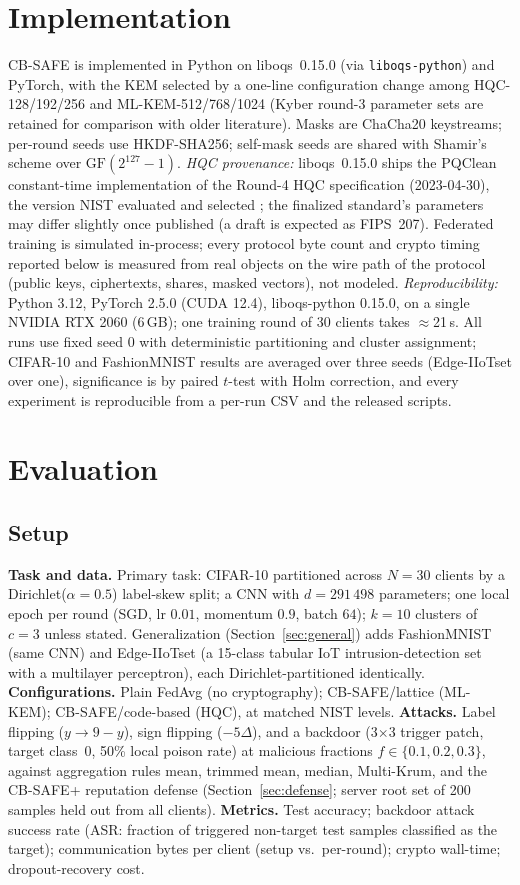 \documentclass[conference]{IEEEtran}
\begin{document}
\section{Implementation}
CB-SAFE is implemented in Python on liboqs~0.15.0 (via \texttt{liboqs-python}) and
PyTorch, with the KEM selected by a one-line configuration change among HQC-128/192/256
and ML-KEM-512/768/1024 (Kyber round-3 parameter sets are retained for comparison
with older literature). Masks are ChaCha20 keystreams; per-round seeds use
HKDF-SHA256; self-mask seeds are shared with Shamir's scheme over
$\mathrm{GF}(2^{127}-1)$. \emph{HQC provenance:} liboqs~0.15.0 ships the PQClean
constant-time implementation of the Round-4 HQC specification (2023-04-30), the
version NIST evaluated and selected \cite{nistir8545}; the finalized standard's
parameters may differ slightly once published (a draft is expected as FIPS~207).
Federated training is simulated in-process; every protocol byte count and crypto
timing reported below is measured from real objects on the wire path of the
protocol (public keys, ciphertexts, shares, masked vectors), not modeled.
\emph{Reproducibility:} Python 3.12, PyTorch 2.5.0 (CUDA 12.4), liboqs-python
0.15.0, on a single NVIDIA RTX 2060 (6\,GB); one training round of 30 clients takes
$\approx$21\,s. All runs use fixed seed 0 with deterministic partitioning and
cluster assignment; CIFAR-10 and FashionMNIST results are averaged over three seeds
(Edge-IIoTset over one), significance is by paired $t$-test with Holm correction,
and every experiment is reproducible from a per-run CSV and the released scripts.

\section{Evaluation}\label{sec:eval}
\subsection{Setup}
\textbf{Task and data.} Primary task: CIFAR-10 partitioned across $N{=}30$ clients
by a Dirichlet($\alpha{=}0.5$) label-skew split; a CNN with $d{=}291\,498$
parameters; one local epoch per round (SGD, lr $0.01$, momentum $0.9$, batch $64$);
$k{=}10$ clusters of $c{=}3$ unless stated. Generalization (Section~\ref{sec:general})
adds FashionMNIST (same CNN) and Edge-IIoTset (a 15-class tabular IoT
intrusion-detection set with a multilayer perceptron), each Dirichlet-partitioned
identically. \textbf{Configurations.} Plain FedAvg (no
cryptography); CB-SAFE/lattice (ML-KEM); CB-SAFE/code-based (HQC), at matched NIST
levels. \textbf{Attacks.} Label flipping ($y \to 9-y$), sign flipping
($-5\Delta$), and a backdoor \cite{bagdasaryan2020} (3$\times$3 trigger patch,
target class~0, 50\% local poison rate) at malicious fractions $f \in \{0.1, 0.2, 0.3\}$, against aggregation
rules mean, trimmed mean, median, Multi-Krum, and the CB-SAFE+ reputation defense
(Section~\ref{sec:defense}; server root set of 200 samples held out from all
clients). \textbf{Metrics.} Test accuracy;
backdoor attack success rate (ASR: fraction of triggered non-target test samples
classified as the target); communication bytes per client (setup vs.\ per-round);
crypto wall-time; dropout-recovery cost.
\end{document}
